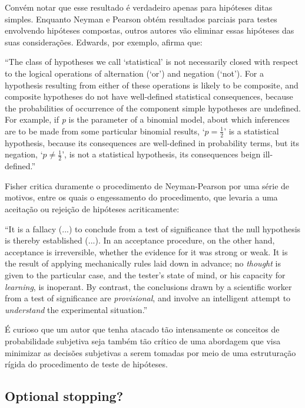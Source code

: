 Convém notar que esse resultado é verdadeiro apenas para hipóteses ditas simples. Enquanto Neyman e Pearson obtém resultados
parciais para testes envolvendo hipóteses compostas, outros autores vão eliminar essas hipóteses das suas considerações.
Edwards, por exemplo, afirma que:

``The class of hypotheses we call `statistical' is not necessarily closed with respect to the logical operations of
alternation (`or') and negation (`not'). For a hypothesis resulting from either of these operations is likely to be composite,
and composite hypotheses do not have well-defined statistical consequences, because the probabilities of occurrence of the
component simple hypotheses are undefined. For example, if {\em p} is the parameter of a binomial model, about which inferences
are to be made from some particular binomial results, `$p = \frac{1}{2}$' is a statistical hypothesis, because its 
consequences are well-defined in probability terms, but its negation, `$p \neq \frac{1}{2}$', is not a statistical hypothesis,
its consequences beign ill-defined.''\cite{Edwards72}

Fisher critica duramente o procedimento de Neyman-Pearson por uma série de motivos, entre os quais o engessamento do procedimento,
que levaria a uma aceitação ou rejeição de hipóteses acriticamente:

``It is a fallacy (...) to conclude from a test of significance that the null hypothesis is thereby established (...).
In an acceptance procedure, on the other hand, acceptance is irreversible, whether the evidence for it was strong or weak.
It is the result of applying mechanically rules laid down in advance; no {\em thought} is given to the particular case,
and the tester's state of mind, or his capacity for {\em learning}, is inoperant.
By contrast, the conclusions drawn by a scientific worker from a test of significance are {\em provisional}, and involve
an intelligent attempt to {\em understand} the experimental situation.''\cite{Fisher1955}

É curioso que um autor que tenha atacado tão intensamente os conceitos de probabilidade subjetiva seja também tão crítico de 
uma abordagem que visa minimizar as decisões subjetivas a serem tomadas por meio de uma estruturação rígida do procedimento
de teste de hipóteses. 

\subsection {Optional stopping?}

